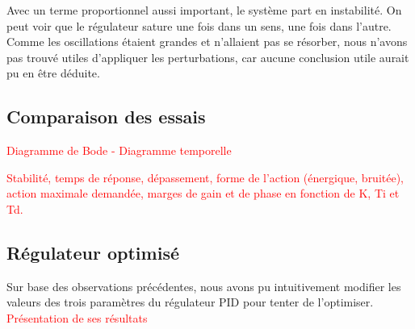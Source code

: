 Avec un terme proportionnel aussi important, le système part en instabilité.
On peut voir que le régulateur sature une fois dans un sens, une fois dans l'autre.
Comme les oscillations étaient grandes et n'allaient pas se résorber, nous
n'avons pas trouvé utiles d'appliquer les perturbations, car aucune conclusion
utile aurait pu en être déduite.

\subsection{Comparaison des essais}
\textcolor{red}{Diagramme de Bode - Diagramme temporelle\\}

\textcolor{red}{Stabilité, temps de réponse, dépassement, forme de l’action (énergique, bruitée), action maximale demandée, marges de gain et de phase en fonction de K, Ti et Td.}

\subsection{Régulateur optimisé}
Sur base des observations précédentes, nous avons pu intuitivement modifier les valeurs des trois paramètres du régulateur PID pour tenter de l'optimiser.\\

\textcolor{red}{Présentation de ses résultats}

